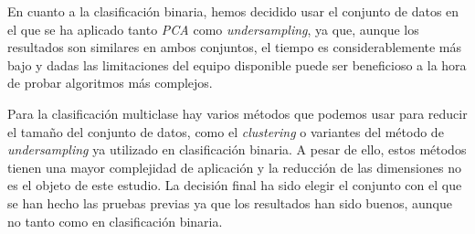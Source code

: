En cuanto a la clasificación binaria, hemos decidido usar el conjunto de datos en el que se ha aplicado tanto \textit{PCA} como \textit{undersampling}, ya que, aunque los resultados son similares en ambos conjuntos, el tiempo es considerablemente más bajo y dadas las limitaciones del equipo disponible puede ser beneficioso a la hora de probar algoritmos más complejos.

\vspace{1em}

Para la clasificación multiclase hay varios métodos que podemos usar para reducir el tamaño del conjunto de datos, como el \textit{clustering} o variantes del método de \textit{undersampling} ya utilizado en clasificación binaria. A pesar de ello, estos métodos tienen una mayor complejidad de aplicación y la reducción de las dimensiones no es el objeto de este estudio. La decisión final ha sido elegir el conjunto con el que se han hecho las pruebas previas ya que los resultados han sido buenos, aunque no tanto como en clasificación binaria.
